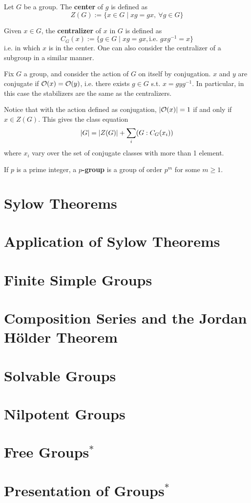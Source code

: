 \documentclass{article}
\begin{document}
\begin{definition}[Center]
    Let $G$ be a group. The \textbf{center} of $g$ is defined as
    \[
        Z(G) := \{ x \in G \mid xg = gx,\ \forall g \in G \}
    \]
\end{definition}

\begin{definition}[Centralizer]
    Given $x \in G$, the \textbf{centralizer} of $x$ in $G$ is defined as
    \[
        C_G(x) := \{ g \in G \mid xg = gx, \text{i.e. }gxg^{-1} = x \}
    \]
    i.e. in which $x$ is in the center. One can also consider the centralizer of a subgroup in a similar manner. 
\end{definition}

\begin{example}
    Fix $G$ a group, and consider the action of $G$ on itself by conjugation. $x$ and $y$ are conjugate if $\mathcal{O}(x) = \mathcal{O}(y)$, i.e. there exists $g \in G$ s.t. $x = gyg^{-1}$. In particular, in this case the stabilizers are the same as the centralizers.

    Notice that with the action defined as conjugation, $\left|\mathcal{O}(x)\right| = 1$ if and only if $x \in Z(G)$. This gives the class equation 
    \[
        \left|G\right| = \left|Z(G)\right| + \sum_i (G : C_G(x_i))
    \]
    where $x_i$ vary over the set of conjugate classes with more than 1 element. 
\end{example}

\begin{definition}[$p$-group]
    If $p$ is a prime integer, a \textbf{$p$-group} is a group of order $p^m$ for some $m \geq 1$.
\end{definition}
    
\section{Sylow Theorems}

\section{Application of Sylow Theorems}

\section{Finite Simple Groups}

\section{Composition Series and the Jordan H\"older Theorem}

\section{Solvable Groups}

\section{Nilpotent Groups}

\section{Free Groups$^{\ast}$}

\section{Presentation of Groups$^{\ast}$}
\end{document}
